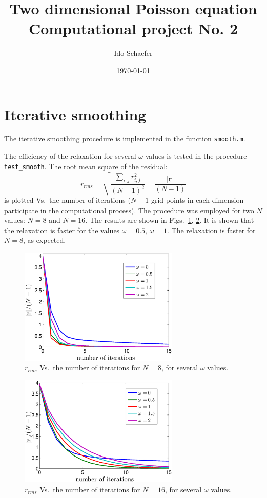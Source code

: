 \documentclass[12pt, a4paper]{article}
\begin{document}
\title{Two dimensional Poisson equation\\
Computational project No. 2}
\author{Ido Schaefer}
\date{\today}
\maketitle

\section{Iterative smoothing}

The iterative smoothing procedure is implemented in the function \texttt{smooth.m}.

The efficiency of the relaxation for several $\omega$ values is tested in the procedure \texttt{test\_smooth}. The root mean square of the residual:
\begin{equation}
	r_{rms} = \sqrt{\frac{\sum_{i,j}r_{i,j}^2}{(N-1)^2}} = \frac{|\mathbf{r}|}{(N-1)}
\end{equation}
is plotted Vs.\ the number of iterations ($N-1$ grid points in each dimension participate in the computational process). The procedure was employed for two $N$ values: $N=8$ and $N=16$. The results are shown in Figs.~\ref{fig:relaxw8}, \ref{fig:relaxw16}. It is shown that the relaxation is faster for the values $\omega=0.5$, $\omega=1$. The relaxation is faster for $N=8$, as expected.

\begin{figure}[htb]
	\centering\includegraphics[width=3in]{relax_omega8}
	\caption{$r_{rms}$ Vs.\ the number of iterations for $N=8$, for several $\omega$ values.}\label{fig:relaxw8}
\end{figure}

\begin{figure}[htb]
	\centering\includegraphics[width=3in]{relax_omega16}
	\caption{$r_{rms}$ Vs.\ the number of iterations for $N=16$, for several $\omega$ values.}\label{fig:relaxw16}
\end{figure}
 
\end{document}
